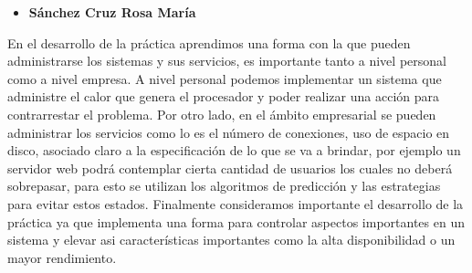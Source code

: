 
\begin{itemize}
\item \textbf{Sánchez Cruz Rosa María}
\end{itemize}
En el desarrollo de la práctica aprendimos una forma con la que pueden administrarse los sistemas y sus servicios, es importante tanto a nivel personal como a nivel empresa.
A nivel personal podemos implementar un sistema que administre el calor que genera el procesador y poder realizar una acción para contrarrestar el problema. Por otro lado, en el ámbito empresarial se pueden administrar los servicios como lo es el número de conexiones, uso de espacio en disco, asociado claro a la especificación de lo que se va a brindar, por ejemplo un servidor web podrá contemplar cierta cantidad de usuarios los cuales no deberá sobrepasar, para esto se utilizan los algoritmos de predicción y las estrategias para evitar estos estados. 
Finalmente consideramos importante el desarrollo de la práctica ya que implementa una forma para controlar aspectos importantes en un sistema y elevar asi características importantes como la alta disponibilidad o un mayor rendimiento.